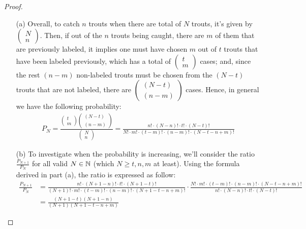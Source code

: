 \documentclass{article}
\begin{document}
\begin{proof}
    
    \hfil

    \begin{itemize}
        \item[(a)] Overall, to catch $n$ trouts when there are total of $N$ trouts, it's given by $\begin{pmatrix}N\\n\end{pmatrix}$. Then, if out of the $n$ trouts being caught, there are $m$ of them that are previously labeled, it implies one must have chosen $m$ out of $t$ trouts that have been labeled previously, which has a total of $\begin{pmatrix}t\\m\end{pmatrix}$ cases; and, since the rest $(n-m)$ non-labeled trouts must be chosen from the $(N-t)$ trouts that are not labeled, there are $\begin{pmatrix}(N-t)\\(n-m)\end{pmatrix}$ cases. Hence, in general we have the following probability:
        \begin{align}
            P_N = \frac{\begin{pmatrix}t\\m\end{pmatrix}\begin{pmatrix}(N-t)\\(n-m)\end{pmatrix}}{\begin{pmatrix}N\\n\end{pmatrix}} = \frac{n!\cdot (N-n)! \cdot t!\cdot (N-t)!}{N! \cdot m!\cdot (t-m)! \cdot (n-m)!\cdot(N-t-n+m)!}
        \end{align}
        \item[(b)] To investigate when the probability is increasing, we'll consider the ratio $\frac{P_{N+1}}{P_N}$ for all valid $N \in \mathbb{N}$ (which $N\geq t,n,m$ at least). Using the formula derived in part (a), the ratio is expressed as follow:
        \begin{align}
            \frac{P_{N+1}}{P_N}&=\frac{n!\cdot (N+1-n)!\cdot t!\cdot (N+1-t)!}{(N+1)!\cdot m!\cdot (t-m)!\cdot (n-m)!\cdot (N+1-t-n+m)!}\cdot \frac{N!\cdot m!\cdot (t-m)!\cdot (n-m)!\cdot (N-t-n+m)!}{n!\cdot(N-n)!\cdot t!\cdot (N-t)!}\\
            &= \frac{(N+1-t)(N+1-n)}{(N+1)(N+1-t-n+m)}

\end{align}
\end{itemize}
\end{proof}
\end{document}
